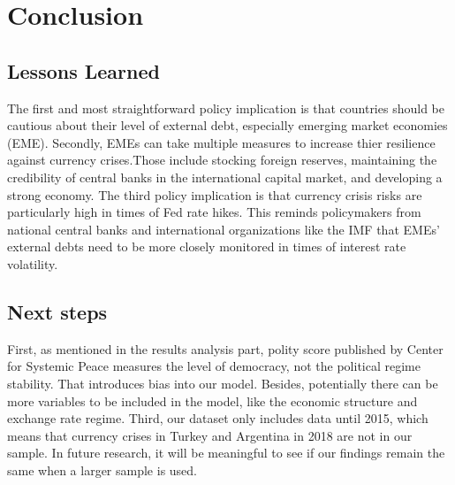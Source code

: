 \documentclass[12pt,]{article}
\begin{document}
\section{Conclusion}\label{conclusion}

\subsection{Lessons Learned}\label{lessons-learned}

The first and most straightforward policy implication is that countries
should be cautious about their level of external debt, especially
emerging market economies (EME). Secondly, EMEs can take multiple
measures to increase thier resilience against currency crises.Those
include stocking foreign reserves, maintaining the credibility of
central banks in the international capital market, and developing a
strong economy. The third policy implication is that currency crisis
risks are particularly high in times of Fed rate hikes. This reminds
policymakers from national central banks and international organizations
like the IMF that EMEs' external debts need to be more closely monitored
in times of interest rate volatility.

\subsection{Next steps}\label{next-steps}

First, as mentioned in the results analysis part, polity score published
by Center for Systemic Peace measures the level of democracy, not the
political regime stability. That introduces bias into our model.
Besides, potentially there can be more variables to be included in the
model, like the economic structure and exchange rate regime. Third, our
dataset only includes data until 2015, which means that currency crises
in Turkey and Argentina in 2018 are not in our sample. In future
research, it will be meaningful to see if our findings remain the same
when a larger sample is used.
\end{document}
